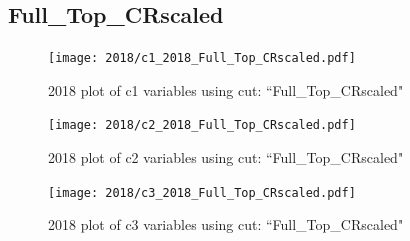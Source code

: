\documentclass{article}
\begin{document}
      \subsection*{Full\_Top\_CRscaled}
                        \begin{figure}[H]
                            \centering
                            \caption{2018 plot of c1 variables using cut: ``Full\_Top\_CRscaled"}
                            \texttt{[image: 2018/c1\_2018\_Full\_Top\_CRscaled.pdf]}
                        \end{figure}    
                        \begin{figure}[H]
                            \centering
                            \caption{2018 plot of c2 variables using cut: ``Full\_Top\_CRscaled"}
                            \texttt{[image: 2018/c2\_2018\_Full\_Top\_CRscaled.pdf]}
                        \end{figure}    
                        \begin{figure}[H]
                            \centering
                            \caption{2018 plot of c3 variables using cut: ``Full\_Top\_CRscaled"}
                            \texttt{[image: 2018/c3\_2018\_Full\_Top\_CRscaled.pdf]}
                        \end{figure}    
\end{document}
